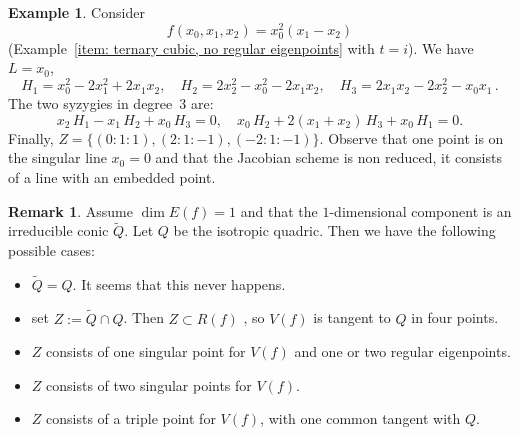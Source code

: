 \documentclass[11pt, a4paper, reqno, captions=tableheading,bibliography=totoc]{scrartcl}
\theoremstyle{plain}
\theoremstyle{definition}
\newtheorem{es}[lemma]{Example}
\newtheorem{rmk}[lemma]{Remark}
\begin{document}
\begin{es}
Consider
\[
f(x_0,x_1,x_2)=x_0^2 (x_1 - x_2)
\]
(Example~\eqref{item: ternary cubic, no regular eigenpoints} with $t=i$).
We have $L=x_0$,
\[
H_1=x_0^2-2x_1^2+2x_1 x_2, \quad H_2= 2x_2^2-x_0^2-2x_1 x_2, \quad H_3= 2x_1x_2-2x_2^2-x_0x_1 \,.
\]
The two syzygies in degree~$3$ are:
\[
x_2 \, H_1 - x_1 \, H_2 + x_0 \, H_3 = 0, \quad x_0 \, H_2 + 2(x_1+x_2) \, H_3 + x_0 \, H_1 = 0.
\]
Finally, $Z= \{ (0:1:1),(2:1:-1),(-2:1:-1)\}$. Observe that one point is on the singular line $x_0=0$
and that the Jacobian scheme is non reduced, it consists of a line with an embedded point.
\end{es}

\begin{rmk}
Assume $\dim E(f) =1$ and that the $1$-dimensional component is an irreducible conic $\tilde Q$. Let $Q$ be the isotropic quadric. Then we have the following possible cases:
\begin{itemize}
\item $\tilde Q = Q$. It seems that this never happens.
\item set $Z:= \tilde Q \cap Q$. Then $Z\subset R(f)$ , so $V(f)$ is tangent to $Q$ in four points.
\item $Z$ consists of one singular point for $V(f)$ and one or two regular eigenpoints.
\item $Z$ consists of two singular points for $V(f)$.
\item $Z$ consists of a triple point for $V(f)$, with one common tangent with $Q$.
\end{itemize}
\end{rmk}






\end{document}
